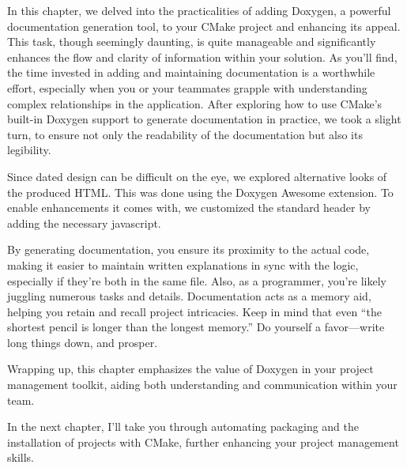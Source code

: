 In this chapter, we delved into the practicalities of adding Doxygen, a powerful documentation generation tool, to your CMake project and enhancing its appeal. This task, though seemingly daunting, is quite manageable and significantly enhances the flow and clarity of information within your solution. As you’ll find, the time invested in adding and maintaining documentation is a worthwhile effort, especially when you or your teammates grapple with understanding complex relationships in the application. After exploring how to use CMake’s built-in Doxygen support to generate documentation in practice, we took a slight turn, to ensure not only the readability of the documentation but also its legibility.

Since dated design can be difficult on the eye, we explored alternative looks of the produced HTML. This was done using the Doxygen Awesome extension. To enable enhancements it comes with, we customized the standard header by adding the necessary javascript.

By generating documentation, you ensure its proximity to the actual code, making it easier to maintain written explanations in sync with the logic, especially if they’re both in the same file. Also, as a programmer, you’re likely juggling numerous tasks and details. Documentation acts as a memory aid, helping you retain and recall project intricacies. Keep in mind that even “the shortest pencil is longer than the longest memory.” Do yourself a favor—write long things down, and prosper.

Wrapping up, this chapter emphasizes the value of Doxygen in your project management toolkit, aiding both understanding and communication within your team.

In the next chapter, I’ll take you through automating packaging and the installation of projects with CMake, further enhancing your project management skills.